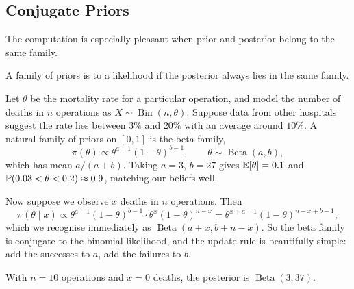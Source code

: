 \documentclass[a4paper]{scrartcl}
\newcommand{\Bin}{\operatorname{Bin}}
\newcommand{\BetaD}{\operatorname{Beta}}
\begin{document}
\subsection{Conjugate Priors}

The computation is especially pleasant when prior and posterior belong to the same family.

\begin{definition}[Conjugacy]
  A family of priors is  to a likelihood if the posterior always lies in the same family.
\end{definition}

\begin{example}
  Let $\theta$ be the mortality rate for a particular operation, and model the number of deaths in $n$ operations as $X \sim \Bin(n, \theta)$. Suppose data from other hospitals suggest the rate lies between $3\%$ and $20\%$ with an average around $10\%$. A natural family of priors on $[0,1]$ is the beta family,
  $$
  \pi(\theta) \propto \theta^{a-1}(1-\theta)^{b-1}, \qquad \theta \sim \BetaD(a,b),
  $$
  which has mean $a/(a+b)$. Taking $a = 3$, $b = 27$ gives $\mathbb{E}[\theta] = 0.1$ and $\mathbb{P}(0.03 < \theta < 0.2) \approx 0.9$, matching our beliefs well.

  Now suppose we observe $x$ deaths in $n$ operations. Then
  $$
  \pi(\theta \mid x) \propto \theta^{a-1}(1-\theta)^{b-1}\cdot\theta^x(1-\theta)^{n-x} = \theta^{x + a - 1}(1-\theta)^{n - x + b -1},
  $$
  which we recognise immediately as $\BetaD(a + x, b + n - x)$. So the beta family is conjugate to the binomial likelihood, and the update rule is beautifully simple: add the successes to $a$, add the failures to $b$.

  With $n = 10$ operations and $x = 0$ deaths, the posterior is $\BetaD(3, 37)$.


\end{example}
\end{document}
